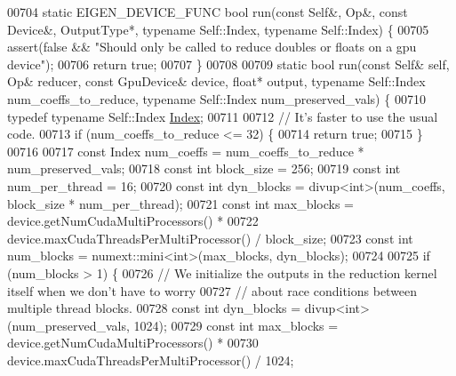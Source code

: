 \begin{DoxyCode}
00704   \textcolor{keyword}{static} EIGEN\_DEVICE\_FUNC \textcolor{keywordtype}{bool} run(\textcolor{keyword}{const} Self&, Op&, \textcolor{keyword}{const} Device&, OutputType*, \textcolor{keyword}{typename} Self::Index, \textcolor{keyword}{
      typename} Self::Index) \{
00705     assert(\textcolor{keyword}{false} && \textcolor{stringliteral}{"Should only be called to reduce doubles or floats on a gpu device"});
00706     \textcolor{keywordflow}{return} \textcolor{keyword}{true};
00707   \}
00708 
00709   \textcolor{keyword}{static} \textcolor{keywordtype}{bool} run(\textcolor{keyword}{const} Self& \textcolor{keyword}{self}, Op& reducer, \textcolor{keyword}{const} GpuDevice& device, \textcolor{keywordtype}{float}* output, \textcolor{keyword}{typename} 
      Self::Index num\_coeffs\_to\_reduce, \textcolor{keyword}{typename} Self::Index num\_preserved\_vals) \{
00710     \textcolor{keyword}{typedef} \textcolor{keyword}{typename} Self::Index \hyperlink{namespace_eigen_a62e77e0933482dafde8fe197d9a2cfde}{Index};
00711 
00712     \textcolor{comment}{// It's faster to use the usual code.}
00713     \textcolor{keywordflow}{if} (num\_coeffs\_to\_reduce <= 32) \{
00714       \textcolor{keywordflow}{return} \textcolor{keyword}{true};
00715     \}
00716 
00717     \textcolor{keyword}{const} Index num\_coeffs = num\_coeffs\_to\_reduce * num\_preserved\_vals;
00718     \textcolor{keyword}{const} \textcolor{keywordtype}{int} block\_size = 256;
00719     \textcolor{keyword}{const} \textcolor{keywordtype}{int} num\_per\_thread = 16;
00720     \textcolor{keyword}{const} \textcolor{keywordtype}{int} dyn\_blocks = divup<int>(num\_coeffs, block\_size * num\_per\_thread);
00721     \textcolor{keyword}{const} \textcolor{keywordtype}{int} max\_blocks = device.getNumCudaMultiProcessors() *
00722                            device.maxCudaThreadsPerMultiProcessor() / block\_size;
00723     \textcolor{keyword}{const} \textcolor{keywordtype}{int} num\_blocks = numext::mini<int>(max\_blocks, dyn\_blocks);
00724 
00725     \textcolor{keywordflow}{if} (num\_blocks > 1) \{
00726       \textcolor{comment}{// We initialize the outputs in the reduction kernel itself when we don't have to worry}
00727       \textcolor{comment}{// about race conditions between multiple thread blocks.}
00728       \textcolor{keyword}{const} \textcolor{keywordtype}{int} dyn\_blocks = divup<int>(num\_preserved\_vals, 1024);
00729       \textcolor{keyword}{const} \textcolor{keywordtype}{int} max\_blocks = device.getNumCudaMultiProcessors() *
00730                              device.maxCudaThreadsPerMultiProcessor() / 1024;

\end{DoxyCode}
